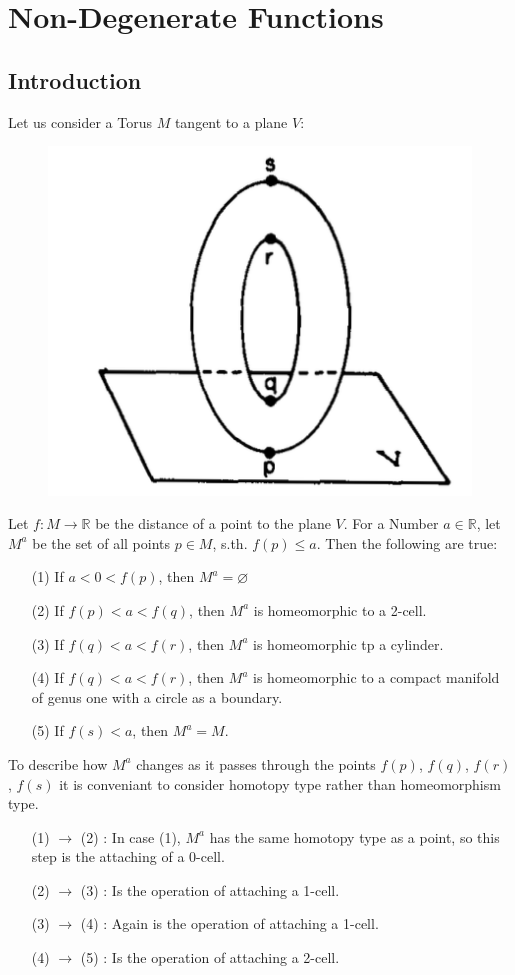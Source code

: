 \documentclass{article}
\theoremstyle{plain}
\theoremstyle{plain}
\theoremstyle{plain}
\theoremstyle{definition}
\theoremstyle{remark}
\begin{document}
\section{Non-Degenerate Functions}

\subsection{Introduction}

Let us consider a Torus $M$ tangent to a plane $V$:
\begin{figure}[H]
    \centering
    \includegraphics[width=0.4\linewidth]{resources/Diagram1.png}
    \label{fig:diagram1}
\end{figure}
Let $f: M \rightarrow \mathbb{R}$ be the distance of a point to the plane $V$. 
For a Number $a \in \mathbb{R} $, let $M^a$ be the set of all points $p \in M$, s.th. $f(p) \leq a$.
Then the following are true:
\begin{enumerate}
   \item[(1)] If $a < 0 < f(p)$, then $M^a = \varnothing$
   \item[(2)] If $f(p) < a < f(q)$, then $M^a$ is homeomorphic to a 2-cell.
   \item[(3)] If $f(q) < a < f(r)$, then $M^a$ is homeomorphic tp a cylinder.
   \item[(4)] If $f(q) < a < f(r)$, then $M^a$ is homeomorphic to a compact manifold of genus one with a circle as a boundary.
   \item[(5)] If $f(s) < a$, then $M^a = M$.
\end{enumerate}

To describe how $M^a$ changes as it passes through the points $f(p)$, $f(q)$, $f(r)$, $f(s)$ it is conveniant to consider
homotopy type rather than homeomorphism type. 
\begin{enumerate}[leftmargin=2cm]
   \item[(1) $\rightarrow$ (2)]: In case (1), $M^a$ has the same homotopy type as a point, so this step is the attaching of a 0-cell. 
   \item[(2) $\rightarrow$ (3)]: Is the operation of attaching a 1-cell. 
   \item[(3) $\rightarrow$ (4)]: Again is the operation of attaching a 1-cell. 
   \item[(4) $\rightarrow$ (5)]: Is the operation of attaching a 2-cell. 
\end{enumerate}
\end{document}
